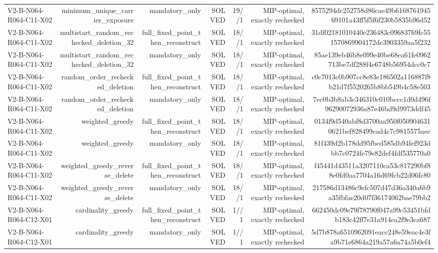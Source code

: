 {\begin{longtable}{lrrrrrr}
V2-B-N064-R064-C11-X02 & minimum\_unique\_carrier\_exposure & mandatory\_only & SOLVED & 19//1 & MIP-optimal, exactly rechecked & 8575294dc252758d86cae49b616876194569101a43ff5f5f6f230b5835b96d52 \\
V2-B-N064-R064-C11-X02 & multistart\_random\_rechecked\_deletion\_32 & full\_fixed\_point\_then\_reconstruct & SOLVED & 18//1 & MIP-optimal, exactly rechecked & 31df02181010440e236483c09683769fc551570869904172dc3903359aa5f232 \\
V2-B-N064-R064-C11-X02 & multistart\_random\_rechecked\_deletion\_32 & mandatory\_only & SOLVED & 18//1 & MIP-optimal, exactly rechecked & 85ae139eb46b8e099e40be68ea61fe0962713be7df288f4e6748b56954dcc0c7 \\
V2-B-N064-R064-C11-X02 & random\_order\_rechecked\_deletion & full\_fixed\_point\_then\_reconstruct & SOLVED & 18//1 & MIP-optimal, exactly rechecked & c0c7013c0b907cc8e83e186502a116887f8b21d7f5520265b8bb549b4c58e503 \\
V2-B-N064-R064-C11-X02 & random\_order\_rechecked\_deletion & mandatory\_only & SOLVED & 18//1 & MIP-optimal, exactly rechecked & 7ec0b3b8ab3c346310c010bccc1d0d496f96290072936a87e46bd9d9973ddf45 \\
V2-B-N064-R064-C11-X02 & weighted\_greedy & full\_fixed\_point\_then\_reconstruct & SOLVED & 18//1 & MIP-optimal, exactly rechecked & 0134f9d540abf8d3700aa950f0509046310621bef828499cad4c7c9815575aec \\
V2-B-N064-R064-C11-X02 & weighted\_greedy & mandatory\_only & SOLVED & 18//1 & MIP-optimal, exactly rechecked & 81f439d2b178dd95fbed585db94fef923dbb7c0724fe79e82def4fdf535770a0 \\
V2-B-N064-R064-C11-X02 & weighted\_greedy\_reverse\_delete & full\_fixed\_point\_then\_reconstruct & SOLVED & 18//1 & MIP-optimal, exactly rechecked & f45441d43511a3207110ca53c817290bf88e0fd0aa7704a16d69fcb22d06fc80 \\
V2-B-N064-R064-C11-X02 & weighted\_greedy\_reverse\_delete & mandatory\_only & SOLVED & 18//1 & MIP-optimal, exactly rechecked & 217586d13486c9efc507d47d36a340a6b9a35fbfae20d07f36174062bae79bb2 \\
V2-B-N064-R064-C12-X01 & cardinality\_greedy & full\_fixed\_point\_then\_reconstruct & SOLVED & 1//1 & MIP-optimal, exactly rechecked & 662450dc09e79f78790f047a99c53451bfdb183c42ff7e31a914ea2f9e3ca687 \\
V2-B-N064-R064-C12-X01 & cardinality\_greedy & mandatory\_only & SOLVED & 1//1 & MIP-optimal, exactly rechecked & 5d7b878a6510962091eacc248e59eac4e3fa9b71e6864a219a57a6a74a5b0ef4 \\

\end{longtable}}
